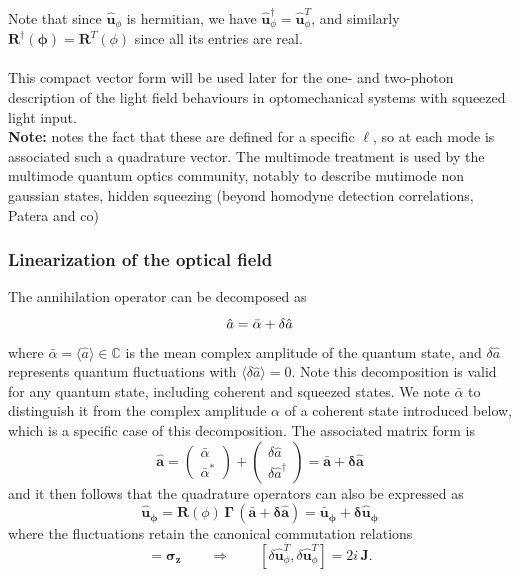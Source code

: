 Note that since $\mathbf{\hat{u}}_\phi$ is hermitian, we have $\mathbf{\hat{u}}_\phi^\dagger = \mathbf{\hat{u}}_\phi^T$, and similarly $\mathbf{R^\dagger(\phi)} = \mathbf{R}^T(\phi)$ since all its entries are real. \\ 
\\
This compact vector form will be used later for the one- and two-photon description of the light field behaviours in optomechanical systems with squeezed light input. \\
\noindent \textbf{Note:} \color{red} notes the fact that these are defined for a specific $\ell$, so at each mode is associated such a quadrature vector. The multimode treatment is used by the multimode quantum optics community, notably to describe mutimode non gaussian states, hidden squeezing (beyond homodyne detection correlations, Patera and co) \color{black}
\subsubsection{Linearization of the optical field}

The annihilation operator can be decomposed as
\begin{equation}
    \hat{a}  = \bar{\alpha} + \delta\hat{a} \\
\label{II.8}
\end{equation}
where \( \bar{\alpha} = \langle \hat{a} \rangle \in \mathbb{C}\) is the mean complex amplitude of the quantum state, and \(\delta\hat{a}\) represents quantum fluctuations with \(\langle \delta\hat{a}\rangle = 0\). Note this decomposition is valid for any quantum state, including coherent and squeezed states. We note $\bar{\alpha}$ to distinguish it from the complex amplitude $\alpha$ of a coherent state introduced below, which is a specific case of this decomposition. The associated matrix form is 
\begin{equation}
\mathbf{\hat{a}} =  \begin{pmatrix} \bar{\alpha}  \\ \bar{\alpha}^*  \end{pmatrix} + \begin{pmatrix} \delta\hat{a} \\ \delta\hat{a}^\dagger \end{pmatrix} =  \mathbf{\bar{a}} + \mathbf{\delta \hat{a}}
\end{equation}
and it then follows that the quadrature operators can also be expressed as
\begin{equation}
    \mathbf{\hat{u}_\phi}  = \mathbf{R}(\phi) \, \mathbf\Gamma  \,(\mathbf{\bar{a}} + \mathbf{\delta \hat{a}})  = \mathbf{\bar{u}_\phi}  + \mathbf{\delta \hat{u}_\phi} 
\end{equation}
where the fluctuations retain the canonical commutation relations
\begin{equation}
[\delta \mathbf{\hat{a}}, \delta \mathbf{\hat{a}}^{\dagger}] = \mathbf{\sigma_z} \qquad \Rightarrow \qquad
[\delta \mathbf{\hat{u}}_\phi^T, \delta \mathbf{\hat{u}}_\phi^T] = 2i\,\mathbf{J}.
\label{II.11}
\end{equation}

